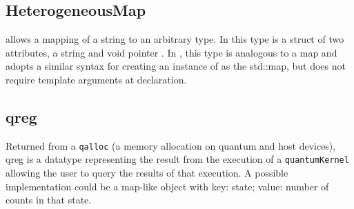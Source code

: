 \subsection{\textbf{HeterogeneousMap}}\label{subsec:HeterogeneousMap}
 allows a mapping of a string to an arbitrary type. In \Clang this type is a struct of two attributes, a string  and void pointer . In \Cpp, this type is analogous to a map and adopts a similar syntax for creating an instance of  as the \Cpp std::map, but does not require template arguments at declaration. 

\subsection{\textbf{qreg}}\label{subsec:qreg}
 Returned from a \texttt{qalloc} (a memory allocation on quantum and host devices), qreg is a datatype representing the result from the execution of a \texttt{quantumKernel} allowing the user to query the results of that execution. A possible implementation could be a map-like object with key: state; value: number of counts in that state.  
